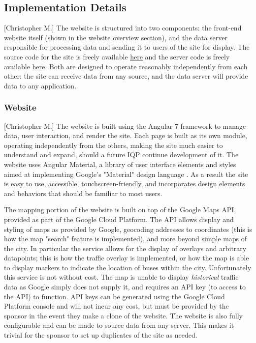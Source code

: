 \documentclass[12pt]{article}                               %
\begin{document}
\subsection{Implementation Details}[Christopher M.]
The website is structured into two components: the front-end website itself (shown in the website overview section), and the data server responsible for processing data and sending it to users of the site for display. The source code for the site is freely available \href{https://github.com/c7c8/Eilat-Transport-Map-Site}{here} and the server code is freely available \href{https://github.com/c7c8/Eilat-Transport-Map-Server}{here}. Both are designed to operate reasonably independently from each other: the site can receive data from any source, and the data server will provide data to any application.

\subsubsection{Website}[Christopher M.]
The website is built using the Angular 7 framework to manage data, user interaction, and render the site. Each page is built as its own module, operating independently from the others, making the site much easier to understand and expand, should a future IQP continue development of it. The website uses Angular Material, a library of user interface elements and styles aimed at implementing Google's "Material" design language \cite{2019AngularMaterial}. As a result the site is easy to use, accessible, touchscreen-friendly, and incorporates design elements and behaviors that should be familiar to most users.

The mapping portion of the website is built on top of the Google Maps API, provided as part of the Google Cloud Platform. The API allows display and styling of maps as provided by Google, geocoding addresses to coordinates (this is how the map "search" feature is implemented), and more beyond simple maps of the city. In particular the service allows for the display of overlays and arbitrary datapoints; this is how the traffic overlay is implemented, or how the map is able to display markers to indicate the location of buses within the city. Unfortunately this service is not without cost. The map is unable to display \textit{historical} traffic data as Google simply does not supply it, and requires an API key (to access to the API) to function. API keys can be generated using the Google Cloud Platform console and will not incur any cost, but must be provided by the sponsor in the event they make a clone of the website. The website is also fully configurable and can be made to source data from any server. This makes it trivial for the sponsor to set up duplicates of the site as needed.
\end{document}
